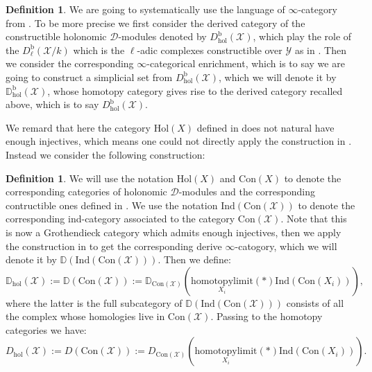 \documentclass[11pt]{book}
\theoremstyle{definition}
\newtheorem{definition}[theorem]{Definition}
\numberwithin{equation}{section}
\begin{document}
\begin{definition}
We are going to systematically use the language of $\infty$-category from \cite{Lurie1}. To be more precise we first consider the derived category of the constructible holonomic $\mathcal{D}$-modules denoted by $D^\mathrm{b}_\mathrm{hol}(\mathcal{X})$, which play the role of the $D^\mathrm{b}_\ell(\mathcal{X}/k)$ which is the $\ell$-adic complexes constructible over $\mathcal{Y}$ as in \cite{GL1}. Then we consider the corresponding $\infty$-categorical enrichment, which is to say we are going to construct a simplicial set from $D^\mathrm{b}_\mathrm{hol}(\mathcal{X})$, which we will denote it by $\mathbb{D}^\mathrm{b}_\mathrm{hol}(\mathcal{X})$, whose homotopy category gives rise to the derived category recalled above, which is to say $D^\mathrm{b}_\mathrm{hol}(\mathcal{X})$.
\end{definition}


\indent We remard that here the category $\mathrm{Hol}(X)$ defined in \cite[Definition 1.1.1]{Abe1} does not natural have enough injectives, which means one could not directly apply the construction in \cite[Section 1.3.2, Section 1.3.5]{Lurie2}. Instead we consider the following construction:


\begin{definition}
We will use the notation $\mathrm{Hol}(X)$ and $\mathrm{Con}(X)$ to denote the corresponding categories of holonomic $\mathcal{D}$-modules and the corresponding contructible ones defined in \cite[Definition after Proposition 1.3.3]{Abe1}. We use the notation $\mathrm{Ind}(\mathrm{Con}(\mathcal{X}))$ to denote the corresponding ind-category associated to the category $\mathrm{Con}(\mathcal{X})$. Note that this is now a Grothendieck category which admits enough injectives, then we apply the construction in \cite[Section 1.3.2, Section 1.3.5]{Lurie2} to get the corresponding derive $\infty$-catogory, which we will denote it by $\mathbb{D}(\mathrm{Ind}(\mathrm{Con}(\mathcal{X})))$. Then we define:
\begin{displaymath}
\mathbb{D}_\mathrm{hol}(\mathcal{X}):=\mathbb{D}(\mathrm{Con}(\mathcal{X})):=\mathbb{D}_{\mathrm{Con}(\mathcal{X})}(\underset{X_i}{\mathrm{homotopylimit}}(*)\mathrm{Ind}(\mathrm{Con}(X_i))),	
\end{displaymath}
where the latter is the full subcategory of $\mathbb{D}(\mathrm{Ind}(\mathrm{Con}(\mathcal{X})))$ consists of all the complex whose homologies live in $\mathrm{Con}(\mathcal{X})$. Passing to the homotopy categories we have:
\begin{displaymath}
D_\mathrm{hol}(\mathcal{X}):=D(\mathrm{Con}(\mathcal{X})):=D_{\mathrm{Con}(\mathcal{X})}(\underset{X_i}{\mathrm{homotopylimit}}(*)\mathrm{Ind}(\mathrm{Con}(X_i))).	
\end{displaymath}

\end{definition}
\end{document}
